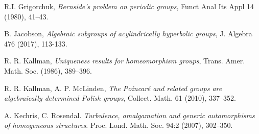 \documentclass[11pt]{amsart}
\theoremstyle{definition}
\begin{document}
\begin{thebibliography}{}
R.I. Grigorchuk, {\em Bernside's problem on periodic groups}, Funct Anal Its Appl 14 (1980), 41--43.









B. Jacobson, {\em Algebraic subgroups of acylindrically hyperbolic groups},
J. Algebra 476 (2017), 113-133.

R. R. Kallman,
{\em Uniqueness results for homeomorphism groups}, Trans. Amer. Math. Soc. (1986), 389--396.

R. R. Kallman, A. P. McLinden, {\em The Poincar\'e and related groups are algebraically determined Polish groups}, Collect. Math. 61 (2010), 337--352.
	


A. Kechris, C. Rosendal. {\em Turbulence, amalgamation and generic automorphisms
of homogeneous structures}. Proc. Lond. Math. Soc. 94:2 (2007), 302--350.





\end{thebibliography}
\end{document}
